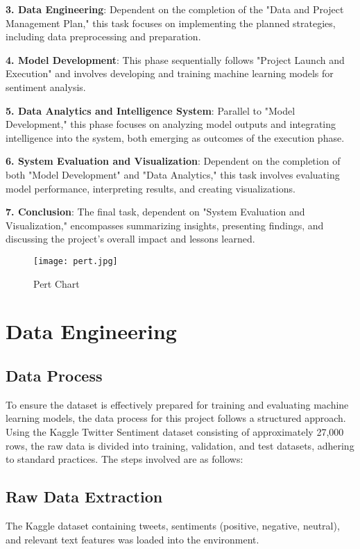 \documentclass[journal]{IEEEtran}
\begin{document}
\textbf{3.  Data Engineering}: Dependent on the completion of the "Data and Project Management Plan," this task focuses on implementing the planned strategies, including data preprocessing and preparation.

\textbf{4.  Model Development}: This phase sequentially follows "Project Launch and Execution" and involves developing and training machine learning models for sentiment analysis.


\textbf{5.  Data Analytics and Intelligence System}: Parallel to "Model Development," this phase focuses on analyzing model outputs and integrating intelligence into the system, both emerging as outcomes of the execution phase.

\textbf{6.  System Evaluation and Visualization}:  Dependent on the completion of both "Model Development" and "Data Analytics," this task involves evaluating model performance, interpreting results, and creating visualizations.


\textbf{7.  Conclusion}: The final task, dependent on "System Evaluation and Visualization," encompasses summarizing insights, presenting findings, and discussing the project's overall impact and lessons learned.


\begin{figure}[H]
\centering
\texttt{[image: pert.jpg]}
\caption{Pert Chart }
\end{figure}

\section{Data Engineering}
\subsection{\textbf{Data Process}}
To ensure the dataset is effectively prepared for training and evaluating machine learning models, the data process for this project follows a structured approach. Using the Kaggle Twitter Sentiment dataset consisting of approximately 27,000 rows, the raw data is divided into training, validation, and test datasets, adhering to standard practices. The steps involved are as follows:

\subsection*{Raw Data Extraction}
The Kaggle dataset containing tweets, sentiments (positive, negative, neutral), and relevant text features was loaded into the environment.
\end{document}
